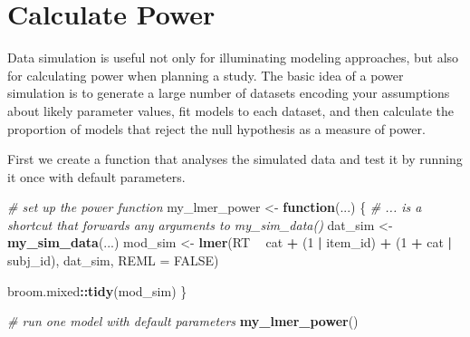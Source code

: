 \documentclass[doc,floatsintext]{apa6}
\newenvironment{Shaded}{\begin{snugshade}}{\end{snugshade}}
\newcommand{\CommentTok}[1]{\textcolor[rgb]{0.56,0.35,0.01}{\textit{#1}}}
\newcommand{\ControlFlowTok}[1]{\textcolor[rgb]{0.13,0.29,0.53}{\textbf{#1}}}
\newcommand{\DataTypeTok}[1]{\textcolor[rgb]{0.13,0.29,0.53}{#1}}
\newcommand{\DecValTok}[1]{\textcolor[rgb]{0.00,0.00,0.81}{#1}}
\newcommand{\KeywordTok}[1]{\textcolor[rgb]{0.13,0.29,0.53}{\textbf{#1}}}
\newcommand{\NormalTok}[1]{#1}
\newcommand{\OperatorTok}[1]{\textcolor[rgb]{0.81,0.36,0.00}{\textbf{#1}}}
\newcommand{\OtherTok}[1]{\textcolor[rgb]{0.56,0.35,0.01}{#1}}
\newcommand{\StringTok}[1]{\textcolor[rgb]{0.31,0.60,0.02}{#1}}
\begin{document}
\hypertarget{calculate-power}{%
\section{Calculate Power}\label{calculate-power}}

Data simulation is useful not only for illuminating modeling approaches, but also for calculating power when planning a study. The basic idea of a power simulation is to generate a large number of datasets encoding your assumptions about likely parameter values, fit models to each dataset, and then calculate the proportion of models that reject the null hypothesis as a measure of power.

First we create a function that analyses the simulated data and test it by running it once with default parameters.

\begin{Shaded}
\begin{Highlighting}[]
\CommentTok{# set up the power function}
\NormalTok{my_lmer_power <-}\StringTok{ }\ControlFlowTok{function}\NormalTok{(...) \{}
  \CommentTok{# ... is a shortcut that forwards any arguments to my_sim_data()}
\NormalTok{  dat_sim <-}\StringTok{ }\KeywordTok{my_sim_data}\NormalTok{(...)}
\NormalTok{  mod_sim <-}\StringTok{ }\KeywordTok{lmer}\NormalTok{(RT }\OperatorTok{~}\StringTok{ }\NormalTok{cat }\OperatorTok{+}\StringTok{ }\NormalTok{(}\DecValTok{1} \OperatorTok{|}\StringTok{ }\NormalTok{item_id) }\OperatorTok{+}\StringTok{ }\NormalTok{(}\DecValTok{1} \OperatorTok{+}\StringTok{ }\NormalTok{cat }\OperatorTok{|}\StringTok{ }\NormalTok{subj_id),}
\NormalTok{                dat_sim, }\DataTypeTok{REML =} \OtherTok{FALSE}\NormalTok{)}
  
\NormalTok{  broom.mixed}\OperatorTok{::}\KeywordTok{tidy}\NormalTok{(mod_sim)}
\NormalTok{\}}
\end{Highlighting}
\end{Shaded}

\begin{Shaded}
\begin{Highlighting}[]
\CommentTok{# run one model with default parameters}
\KeywordTok{my_lmer_power}\NormalTok{()}
\end{Highlighting}
\end{Shaded}
\end{document}
